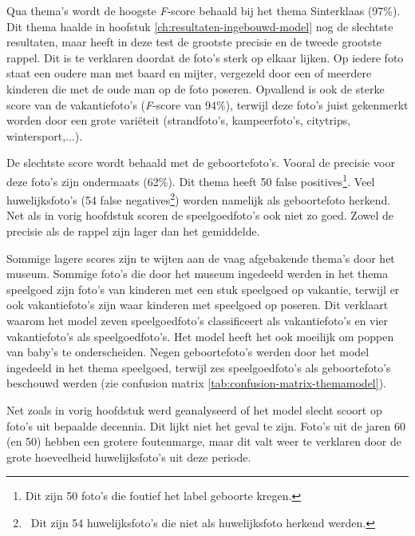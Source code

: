 Qua thema’s wordt de hoogste \textit{F}-score behaald bij het thema Sinterklaas (97\%). Dit thema haalde in hoofstuk \ref{ch:resultaten-ingebouwd-model} nog de slechtste resultaten, maar heeft in deze test de grootste precisie en de tweede grootste rappel. Dit is te verklaren doordat de foto’s sterk op elkaar lijken. Op iedere foto staat een oudere man met baard en mijter, vergezeld door een of meerdere kinderen die met de oude man op de foto poseren. Opvallend is ook de sterke score van de vakantiefoto’s (\textit{F}-score van 94\%), terwijl deze foto’s juist gekenmerkt worden door een grote variëteit (strandfoto’s, kampeerfoto’s, citytrips, wintersport,...).

De slechtste score wordt behaald met de geboortefoto’s. Vooral de precisie voor deze foto’s zijn ondermaats (62\%). Dit thema heeft 50 false positives\footnote{Dit zijn 50 foto's die foutief het label geboorte kregen.}. Veel huwelijksfoto’s (54 false negatives\footnote{~Dit zijn 54 huwelijksfoto's die niet als huwelijksfoto herkend werden.}) worden namelijk als geboortefoto herkend.  Net als in vorig hoofdstuk scoren de speelgoedfoto’s ook niet zo goed. Zowel de precisie als de rappel zijn lager dan het gemiddelde.

Sommige lagere scores zijn te wijten aan de vaag afgebakende thema’s door het museum. Sommige foto’s die door het museum ingedeeld werden in het thema speelgoed zijn  foto’s van kinderen met een stuk speelgoed op vakantie, terwijl er ook vakantiefoto’s zijn waar kinderen met speelgoed op poseren. Dit verklaart waarom het model zeven speelgoedfoto’s classificeert als vakantiefoto’s en vier vakantiefoto’s als speelgoedfoto’s. Het model heeft het ook moeilijk om poppen van baby’s te onderscheiden. Negen geboortefoto’s werden door het model ingedeeld in het thema speelgoed, terwijl zes speelgoedfoto’s als geboortefoto’s beschouwd werden (zie confusion matrix \ref{tab:confusion-matrix-themamodel}).

Net zoals in vorig hoofdstuk werd geanalyseerd of het model slecht scoort op foto’s uit bepaalde decennia. Dit lijkt niet het geval te zijn. Foto’s uit de jaren 60 (en 50) hebben een grotere foutenmarge, maar dit valt weer te verklaren door de grote hoeveelheid huwelijksfoto’s uit deze periode.

